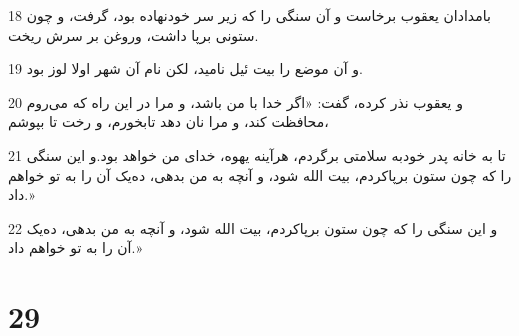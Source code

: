 \par 18 بامدادان یعقوب برخاست و آن سنگی را که زیر سر خودنهاده بود، گرفت، و چون ستونی برپا داشت، وروغن بر سرش ریخت.
\par 19 و آن موضع را بیت ئیل نامید، لکن نام آن شهر اولا لوز بود.
\par 20 و یعقوب نذر کرده، گفت: «اگر خدا با من باشد، و مرا در این راه که می‌روم محافظت کند، و مرا نان دهد تابخورم، و رخت تا بپوشم،
\par 21 تا به خانه پدر خودبه سلامتی برگردم، هرآینه یهوه، خدای من خواهد بود.و این سنگی را که چون ستون برپاکردم، بیت الله شود، و آنچه به من بدهی، ده‌یک آن را به تو خواهم داد.»
\par 22 و این سنگی را که چون ستون برپاکردم، بیت الله شود، و آنچه به من بدهی، ده‌یک آن را به تو خواهم داد.»
 
\chapter{29}

